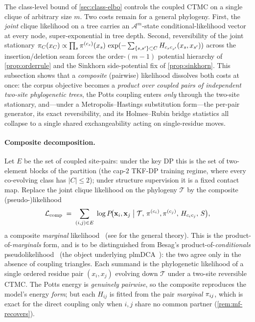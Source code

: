 The class-level bound of \autoref{sec:class-elbo} controls the coupled
CTMC on a single clique of arbitrary size $m$. Two costs remain for a
general phylogeny. First, the \emph{joint} clique likelihood on a tree
carries an $\mathcal{A}^{m}$-state conditional-likelihood vector at every
node, super-exponential in tree depth. Second, reversibility of the
joint stationary $\pi_C(x_C)\propto\prod_s\pi^{(c_s)}(x_s)\,
\exp(-\sum_{\{s,s'\}\subset C}H_{c_sc_{s'}}(x_s,x_{s'}))$ across the
insertion/deletion seam forces the order-$(m{-}1)$ potential hierarchy of
\autoref{prop:orderrule} and the Sinkhorn side-potential fix of
\autoref{prop:sinkhorn}. This subsection shows that a
\emph{composite} (pairwise) likelihood dissolves both costs at once: the
corpus objective becomes a \emph{product over coupled pairs of independent
two-site phylogenetic trees}, the Potts coupling enters \emph{only} through
the two-site stationary, and---under a Metropolis--Hastings substitution
form---the per-pair generator, its exact reversibility, and its
Holmes--Rubin bridge statistics all collapse to a single shared
exchangeability acting on single-residue moves.

\paragraph{Composite decomposition.} Let $E$ be the set of coupled
site-pairs: under the key DP this is the set of two-element blocks of the
partition (the cap-$2$ TKF-DP training regime, where every co-evolving
class has $|C|\le 2$); under structure supervision it is a fixed contact
map. Replace the joint clique likelihood on the phylogeny $\mathcal{T}$
by the composite (pseudo-)likelihood
\begin{equation}
  \mathcal{L}_{\mathrm{comp}}
    \;=\; \sum_{(i,j)\in E}\;
      \log P\!\bigl(\mathbf{x}_i,\mathbf{x}_j \;\big|\; \mathcal{T},\,
        \pi^{(c_i)},\pi^{(c_j)},\,H_{c_ic_j},\,S\bigr),
  \label{eq:comp-objective}
\end{equation}
a composite \emph{marginal} likelihood~\citep{lindsay1988} (see
\citealp{varin2011} for the general theory). This is the
product-of-\emph{marginals} form, and is to be distinguished from
Besag's product-of-\emph{conditionals} pseudolikelihood~\citep{besag1975}
(the object underlying plmDCA~\citep{ekeberg2013}): the two agree only in
the absence of coupling triangles. Each summand is the phylogenetic
likelihood of a single ordered residue pair $(x_i,x_j)$ evolving down
$\mathcal{T}$ under a two-site reversible CTMC. The Potts energy is
\emph{genuinely pairwise}, so the composite reproduces the model's energy
\emph{form}; but each $H_{ij}$ is fitted from the pair \emph{marginal}
$\pi_{ij}$, which is exact for the direct coupling only when $i,j$ share
no common partner (\autoref{rem:mf-recovers}).

